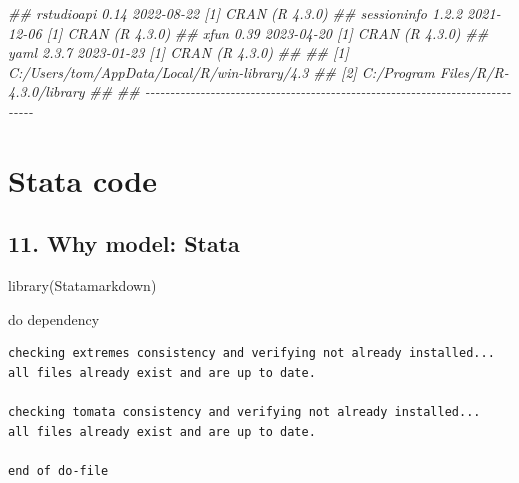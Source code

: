 \documentclass[
  10pt,
  a4paper,
]{book}
\newenvironment{Shaded}{\begin{snugshade}}{\end{snugshade}}
\newcommand{\DocumentationTok}[1]{\textcolor[rgb]{0.37,0.37,0.37}{\textit{#1}}}
\newcommand{\FunctionTok}[1]{\textcolor[rgb]{0.28,0.35,0.67}{#1}}
\newcommand{\KeywordTok}[1]{\textcolor[rgb]{0.00,0.46,0.62}{#1}}
\newcommand{\NormalTok}[1]{\textcolor[rgb]{0.00,0.46,0.62}{#1}}
\begin{document}
\begin{Shaded}
\begin{Highlighting}[]
\DocumentationTok{\#\#  rstudioapi    0.14    2022{-}08{-}22 [1] CRAN (R 4.3.0)}
\DocumentationTok{\#\#  sessioninfo   1.2.2   2021{-}12{-}06 [1] CRAN (R 4.3.0)}
\DocumentationTok{\#\#  xfun          0.39    2023{-}04{-}20 [1] CRAN (R 4.3.0)}
\DocumentationTok{\#\#  yaml          2.3.7   2023{-}01{-}23 [1] CRAN (R 4.3.0)}
\DocumentationTok{\#\# }
\DocumentationTok{\#\#  [1] C:/Users/tom/AppData/Local/R/win{-}library/4.3}
\DocumentationTok{\#\#  [2] C:/Program Files/R/R{-}4.3.0/library}
\DocumentationTok{\#\# }
\DocumentationTok{\#\# {-}{-}{-}{-}{-}{-}{-}{-}{-}{-}{-}{-}{-}{-}{-}{-}{-}{-}{-}{-}{-}{-}{-}{-}{-}{-}{-}{-}{-}{-}{-}{-}{-}{-}{-}{-}{-}{-}{-}{-}{-}{-}{-}{-}{-}{-}{-}{-}{-}{-}{-}{-}{-}{-}{-}{-}{-}{-}{-}{-}{-}{-}{-}{-}{-}{-}{-}{-}{-}{-}{-}{-}{-}{-}{-}{-}{-}{-}}
\end{Highlighting}
\end{Shaded}

\hypertarget{part-stata-code}{%
\part*{Stata code}\label{part-stata-code}}

\hypertarget{why-model-stata}{%
\chapter*{11. Why model: Stata}\label{why-model-stata}}

\begin{Shaded}
\begin{Highlighting}[]
\FunctionTok{library}\NormalTok{(Statamarkdown)}
\end{Highlighting}
\end{Shaded}

\begin{Shaded}
\begin{Highlighting}[]
\KeywordTok{do}\NormalTok{ dependency}
\end{Highlighting}
\end{Shaded}

\begin{verbatim}
checking extremes consistency and verifying not already installed...
all files already exist and are up to date.

checking tomata consistency and verifying not already installed...
all files already exist and are up to date.

end of do-file
\end{verbatim}
\end{document}
